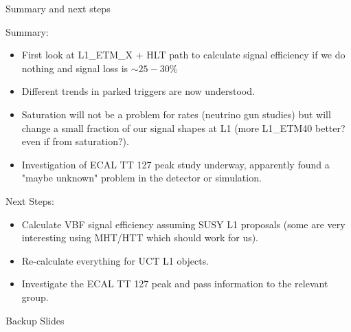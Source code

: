 \documentclass[8pt]{beamer}
\begin{document}
\begin{frame}{Summary and next steps}
 
\begin{block}{Summary:}
 
\begin{itemize}
  \item First look at L1\_ETM\_X + HLT path to calculate signal efficiency if we do nothing and signal loss is $\sim25-30\%$
  \item Different trends in parked triggers are now understood.
  \item Saturation will not be a problem for rates (neutrino gun studies) but will change a small fraction of our signal shapes at L1 (more L1\_ETM40 better? even if from saturation?).
  \item Investigation of ECAL TT 127 peak study underway, apparently found a "maybe unknown" problem in the detector or simulation. 
\end{itemize}

\end{block}

\begin{block}{Next Steps:}
 
\begin{itemize}
  \item Calculate VBF signal efficiency assuming SUSY L1 proposals (some are very interesting using MHT/HTT which should work for us).
  \item Re-calculate everything for UCT L1 objects.
  \item Investigate the ECAL TT 127 peak and pass information to the relevant group.
\end{itemize}
 
\end{block}

\end{frame}

\appendix
\begin{frame}
 
\begin{block}

\begin{center}Backup Slides\end{center}

\end{block}

\end{frame}
\end{document}
